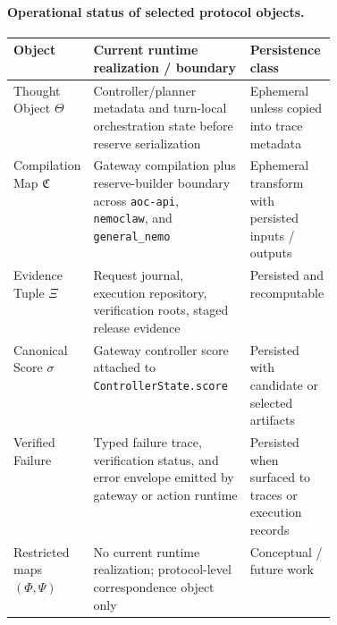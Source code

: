 \documentclass[11pt]{article}
\theoremstyle{remark}
\begin{document}
\paragraph{Operational status of selected protocol objects.}
\begin{center}
\small
\begin{tabularx}{\linewidth}{@{}>{\raggedright\arraybackslash}p{0.22\linewidth}X>{\raggedright\arraybackslash}p{0.20\linewidth}@{}}
\toprule
\textbf{Object} & \textbf{Current runtime realization / boundary} & \textbf{Persistence class} \\
\midrule
Thought Object \(\Theta\) & Controller/planner metadata and turn-local orchestration state before reserve serialization & Ephemeral unless copied into trace metadata \\
\addlinespace
Compilation Map \(\mathfrak{C}\) & Gateway compilation plus reserve-builder boundary across \texttt{aoc-api}, \texttt{nemoclaw}, and \texttt{general\_nemo} & Ephemeral transform with persisted inputs / outputs \\
\addlinespace
Evidence Tuple \(\Xi\) & Request journal, execution repository, verification roots, staged release evidence & Persisted and recomputable \\
\addlinespace
Canonical Score \(\sigma\) & Gateway controller score attached to \texttt{ControllerState.score} & Persisted with candidate or selected artifacts \\
\addlinespace
Verified Failure & Typed failure trace, verification status, and error envelope emitted by gateway or action runtime & Persisted when surfaced to traces or execution records \\
\addlinespace
Restricted maps \((\Phi,\Psi)\) & No current runtime realization; protocol-level correspondence object only & Conceptual / future work \\
\bottomrule
\end{tabularx}
\end{center}
\end{document}
